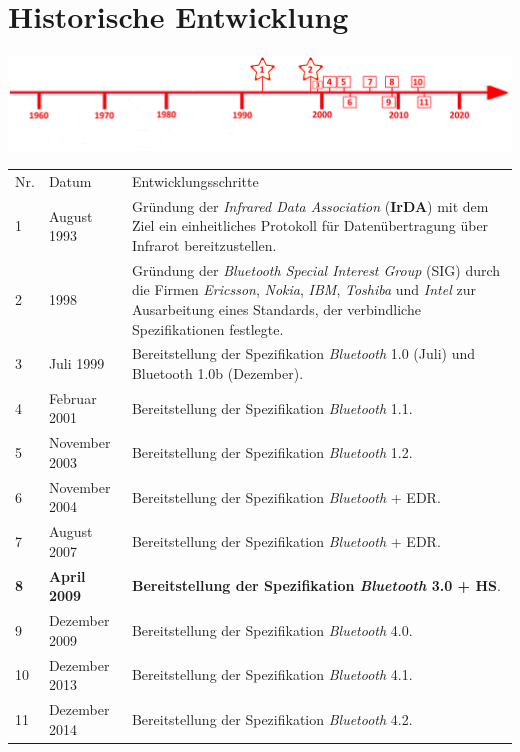 \section*{Historische Entwicklung}
\includegraphics[width=\textwidth]{Kapitel/Bluetooth3.0/Grafiken/Zeitstrahl_Bluetooth3.jpg}
\noindent
{}
\begin{tabular}{p{0.5 cm}p{1.5 cm}p{15.55 cm}}
	Nr. & Datum & Entwicklungsschritte~\cite{bluetooth3.0.7}\\
	1 & August 1993 & Gründung der \textit{Infrared Data Association} (\textbf{IrDA}) mit dem Ziel ein einheitliches Protokoll für Datenübertragung über Infrarot bereitzustellen.\\
	2 & 1998 & Gründung der \textit{Bluetooth Special Interest Group} (SIG) durch die Firmen \textit{Ericsson}, \textit{Nokia}, \textit{IBM}, \textit{Toshiba} und \textit{Intel} zur Ausarbeitung eines Standards, der verbindliche Spezifikationen festlegte.\\
	3 & Juli 1999 & Bereitstellung der Spezifikation \textit{Bluetooth} 1.0 (Juli) und Bluetooth 1.0b (Dezember).\\
	4 & Februar 2001 & Bereitstellung der Spezifikation \textit{Bluetooth} 1.1.\\
	5 & November 2003 & Bereitstellung der Spezifikation \textit{Bluetooth} 1.2.\\
	6 & November 2004 & Bereitstellung der Spezifikation \textit{Bluetooth} + EDR.\\
	7 & August 2007 & Bereitstellung der Spezifikation \textit{Bluetooth} + EDR.\\
	\textbf{8} & \textbf{April 2009} & \textbf{Bereitstellung der Spezifikation \textit{Bluetooth} 3.0 + HS}.\\
	9 & Dezember 2009 & Bereitstellung der Spezifikation \textit{Bluetooth} 4.0.\\
	10 & Dezember 2013 & Bereitstellung der Spezifikation \textit{Bluetooth} 4.1.\\
	11 & Dezember 2014 & Bereitstellung der Spezifikation \textit{Bluetooth} 4.2.\\
\end{tabular}
\par
